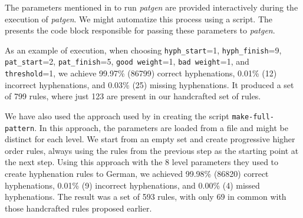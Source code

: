 The parameters mentioned in  to run \emph{patgen} are provided interactively during the execution of \emph{patgen}.
We might automatize this process using a script. The  presents the code block
responsible for passing these parameters to \emph{patgen}.

As an example of execution, when choosing \texttt{hyph\_start}=1, \texttt{hyph\_finish}=9, \texttt{pat\_start}=2, \texttt{pat\_finish}=5,
\texttt{good weight}=1, \texttt{bad weight}=1, and \texttt{threshold}=1, we achieve 99.97\% (86799) correct 
hyphenations, 0.01\% (12) incorrect hyphenations, and 0.03\% (25) missing hyphenations.
It produced a set of 799 rules, where just 123 are present in our handcrafted set of rules.

We have also used the approach used by \textcite{sojka2019} in creating the script \texttt{make-full-pattern}.
In this approach, the parameters are loaded from a file and might be distinct for each level.
We start from an empty set and create progressive higher order rules, always using the rules from the previous
step as the starting point at the next step.
Using this approach with the 8 level parameters they used to create hyphenation rules to German,
we achieved 99.98\% (86820) correct hyphenations, 0.01\% (9) incorrect hyphenations, and 0.00\% (4) missed hyphenations.
The result was a set of 593 rules, with only 69 in common with those handcrafted rules proposed earlier.






